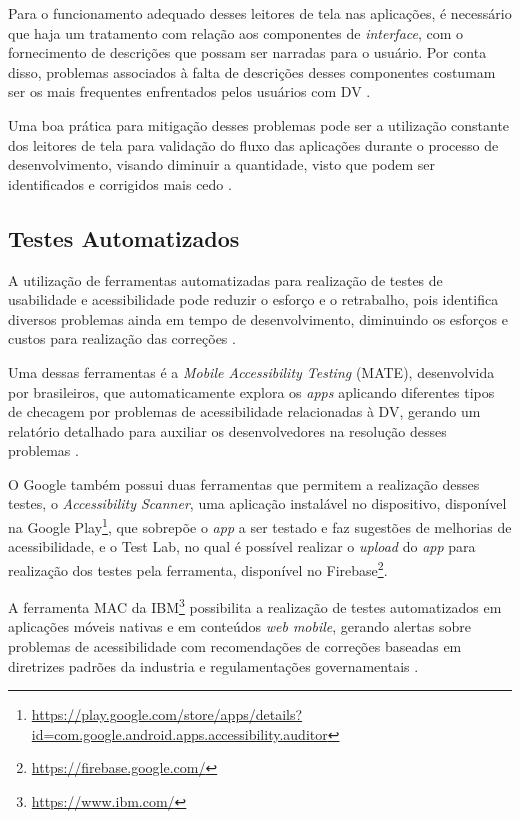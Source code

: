 Para o funcionamento adequado desses leitores de tela nas aplicações, é necessário que haja um tratamento
com relação aos componentes de \emph{interface}, com o fornecimento de descrições que possam ser narradas para o usuário. Por conta disso,
problemas associados à falta de descrições desses componentes costumam ser os mais frequentes enfrentados pelos usuários com DV
\cite{Vendome201941,Christoph2020,Shera2021285}.

Uma boa prática para mitigação desses problemas pode ser a utilização constante dos leitores de tela para validação do fluxo das aplicações durante
o processo de desenvolvimento, visando diminuir a quantidade, visto que podem ser identificados e corrigidos mais cedo \cite{Tomlinson2016377}.

\subsection{Testes Automatizados}

A utilização de ferramentas automatizadas para realização de testes de usabilidade e acessibilidade pode reduzir o esforço
e o retrabalho, pois identifica diversos problemas ainda em tempo de desenvolvimento, diminuindo os esforços e custos para
realização das correções \cite{Christoph2020}.

Uma dessas ferramentas é a \emph{Mobile Accessibility Testing} (MATE), desenvolvida por brasileiros, que automaticamente explora os \emph{apps}
aplicando diferentes tipos de checagem por problemas de acessibilidade relacionadas à DV, gerando um relatório detalhado para auxiliar
os desenvolvedores na resolução desses problemas \cite{Eler2018AutomatedAT}.

O Google também possui duas ferramentas que permitem a realização desses testes, o \emph{Accessibility Scanner}, uma aplicação instalável no
dispositivo, disponível na Google Play\footnote{\url{https://play.google.com/store/apps/details?id=com.google.android.apps.accessibility.auditor}},
que sobrepõe o \emph{app} a ser testado e faz sugestões de melhorias de acessibilidade, e o Test Lab, no qual é possível realizar o \emph{upload}
do \emph{app} para realização dos testes pela ferramenta, disponível no Firebase\footnote{\url{https://firebase.google.com/}}.

A ferramenta MAC da IBM\footnote{\url{https://www.ibm.com/}} possibilita a realização de testes automatizados em aplicações
móveis nativas e em conteúdos \emph{web mobile}, gerando alertas sobre problemas de acessibilidade com recomendações de
correções baseadas em diretrizes padrões da industria e regulamentações governamentais \cite{patil2016enhanced,Yan2019}.


